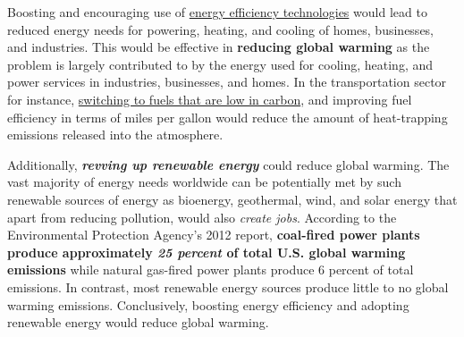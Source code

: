 \begin{flushleft}
Boosting and encouraging use of \underline{energy efficiency technologies} would lead to reduced energy needs for powering, heating, and cooling of homes, businesses, and industries. This would be effective in \textbf{reducing global warming} as the problem is largely contributed to by the energy used for cooling, heating, and power services in industries, businesses, and homes. In the transportation sector for instance, \underline{switching to fuels that are low in carbon}, and improving fuel efficiency in terms of miles per gallon would reduce the amount of heat-trapping emissions released into the atmosphere.\par
Additionally, \textbf{\textit{revving up renewable energy}} could reduce global warming. The vast majority of energy needs worldwide can be potentially met by such renewable sources of energy as bioenergy, geothermal, wind, and solar energy that apart from reducing pollution, would also \emph{create jobs}. According to the Environmental Protection Agency’s 2012 report, \textbf{coal-fired power plants produce approximately \emph{25 percent} of total U.S. global warming emissions} while natural gas-fired power plants produce 6 percent of total emissions. In contrast, most renewable energy sources produce little to no global warming emissions. Conclusively, boosting energy efficiency and adopting renewable energy would reduce global warming.
\end{flushleft}
